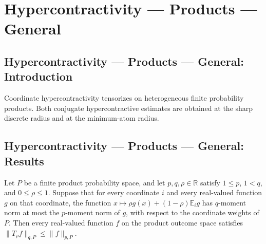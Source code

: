 \section{Hypercontractivity --- Products --- General}
\subsection*{Hypercontractivity --- Products --- General: Introduction}
Coordinate hypercontractivity tensorizes on heterogeneous finite probability products. Both conjugate hypercontractive estimates are obtained at the sharp discrete radius and at the minimum-atom radius.

\subsection*{Hypercontractivity --- Products --- General: Results}

\begin{theorem}
\leanok
{}
Let $P$ be a finite product probability space, and let $p,q,\rho\in\mathbb R$ satisfy
$1\le p$, $1<q$, and $0\le\rho\le1$. Suppose that for every coordinate $i$ and every
real-valued function $g$ on that coordinate, the function $x\mapsto \rho
g(x)+(1-\rho)\mathbb E_i g$ has $q$-moment norm at most the $p$-moment norm of $g$, with
respect to the coordinate weights of $P$. Then every real-valued function $f$ on the
product outcome space satisfies $\|T_\rho f\|_{q,P}\le \|f\|_{p,P}$.
\end{theorem}

